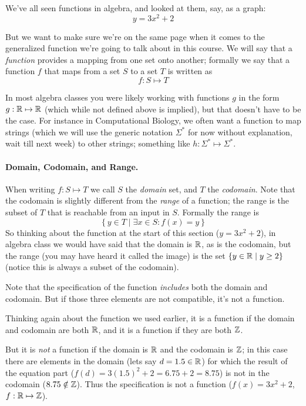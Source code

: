 We've all seen functions in algebra, and looked at them, say, as a graph:
\[
y = 3x^2 + 2
\]

But we want to make sure we're on the same page when it comes to the generalized function we're going to talk about in this course. 
We will say that a \emph{function} provides a mapping from one set onto another; 
formally we say that a function $f$ that maps from a set $S$ to a set $T$ is written as 
\[
f: S \mapsto T
\]

In most algebra classes you were likely working with functions $g$ in the form $g: \operatorname{\mathbb{R}} \mapsto\operatorname{\mathbb{R}}$ (which while not defined above is implied), 
but that doesn't have to be the case. 
For instance in Computational Biology, we often want a function to map strings 
(which we will use the generic notation $\Sigma^*$ for now without explanation, wait till next week)
to other strings; 
something like $h: \Sigma^* \mapsto \Sigma^*$. 

\paragraph{Domain, Codomain, and Range.}
When writing $f: S \mapsto T$ we call $S$ the \emph{domain} set, and $T$ the \emph{codomain}. 
Note that the codomain is slightly different from the \emph{range} of a function; 
the range is the subset of $T$ that is reachable from an input in $S$. 
Formally the range is 
\[
\left\{y \in T \mid \exists x \in S : f(x) = y\right\}
\]
So thinking about the function at the start of this section ($y = 3x^2 + 2$), 
in algebra class we would have said that the domain is $\operatorname{\mathbb{R}}$, as is the codomain, but the range (you may have heard it called the image) 
is the set $\left\{y \in \operatorname{\mathbb{R}} \mid y \ge 2\right\}$ (notice this is always a subset of the codomain). 

\begin{tcolorbox}[colback=blue!5,colframe=blue!75!black,title=Extra details]
Note that the specification of the function \textit{includes} both the domain and codomain. 
But if those three elements are not compatible, it's not a function. 
\vspace{1em}

Thinking again about the function we used earlier, it is a function if the domain and codomain are both $\operatorname{\mathbb{R}}$, 
and it is a function if they are both $\operatorname{\mathbb{Z}}$. 
\vspace{1em}

But it is \emph{not} a function if the domain is $\operatorname{\mathbb{R}}$ and the codomain is $\operatorname{\mathbb{Z}}$; 
in this case there are elements in the domain (lets say $d=1.5\in\operatorname{\mathbb{R}}$) 
for which the result of the equation part ($f(d)=3(1.5)^2+2=6.75+2=8.75$)
is not in the codomain ($8.75\notin\operatorname{\mathbb{Z}}$).    
Thus the specification is not a function ($f(x) = 3x^2 + 2$, $f: \operatorname{\mathbb{R}}\mapsto\operatorname{\mathbb{Z}}$).
\end{tcolorbox}

